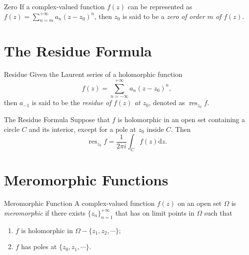 \begin{definition}{Zero}{}
  If a complex-valued function $f(z)$ can be represented as $f(z) = \sum_{n = m}^{+\infty} a_n(z-z_0)^n$,
  then $z_0$ is said to be a \emph{zero of order $m$ of $f(z)$}.
\end{definition}

\section{The Residue Formula}

\begin{definition}{Residue}{}
  Given the Laurent series of a holomorphic function
  \begin{equation}
    f(z) = \sum_{n = -\infty}^{+\infty}a_n(z-z_0)^n,
  \end{equation}
  then $a_{-1}$ is said to be the \emph{residue of $f(z)$ at $z_0$},
  denoted as $\operatorname{res}_{z_0} f$.
\end{definition}

\begin{theorem}{The Residue Formula}{}
  Suppose that $f$ is holomorphic in an open set containing a circle $C$
  and its interior, except for a pole at $z_0$ inside $C$. Then
  \begin{equation}
    \operatorname{res}_{z_0} f = \frac{1}{2 \pi i} \int_C f(z)\mathrm{d} z.
  \end{equation}
\end{theorem}

\section{Meromorphic Functions}

\begin{definition}{Meromorphic Function}{}
  A complex-valued function $f(z)$ on an open set $\Omega$ is \emph{meromorphic} if there exists
  $\{z_n\}_{n=1}^{+\infty}$ that has on limit points in $\Omega$ such that
  \begin{enumerate}
  \item $f$ is holomorphic in $\Omega - \{z_1,z_2,\cdots\}$;
  \item $f$ has poles at $\{z_0,z_1,\cdots\}$.
  \end{enumerate}
\end{definition}


